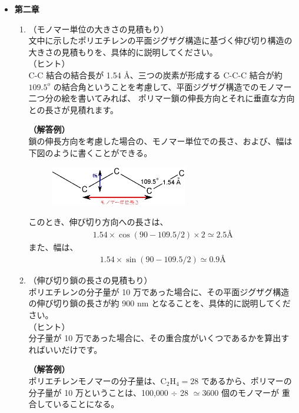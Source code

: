 \documentclass[uplatex,dvipdfmx,a4paper,11pt, titlepage]{jsarticle}
\begin{document}
\begin{itemize}
\begin{enumerate}
	\end{enumerate}

\item
{\bf 第二章}

	\begin{enumerate}
		\item
		（モノマー単位の大きさの見積もり）\\
		文中に示したポリエチレンの平面ジグザグ構造に基づく伸び切り構造の大きさの見積もりを、具体的に説明してください。\\
		（ヒント）\\
		C-C 結合の結合長が 1.54 \AA、三つの炭素が形成する C-C-C 結合が約 $109.5^o$ の結合角ということを考慮して、平面ジグザグ構造でのモノマー二つ分の絵を書いてみれば、
		ポリマー鎖の伸長方向とそれに垂直な方向との長さが見積れます。

		{\bf（解答例）}\\
		鎖の伸長方向を考慮した場合の、モノマー単位での長さ、および、幅は下図のように書くことができる。
		\begin{figure}[htb]
		\centering
		\includegraphics[width=6cm]{figure/fig1.eps}
		\end{figure}

		このとき、伸び切り方向への長さは、
		\begin{align*}
		1.54 \times \cos (90 - 109.5/2) \times 2 \simeq 2.5 \text{\AA}
		\end{align*}
		また、幅は、
		\begin{align*}
		1.54 \times \sin (90 - 109.5/2) \simeq 0.9 \text{\AA}
		\end{align*}

		\item
		（伸び切り鎖の長さの見積もり）\\
		ポリエチレンの分子量が 10 万であった場合に、その平面ジグザグ構造の伸び切り鎖の長さが約 900 nm となることを、具体的に説明してください。\\
		（ヒント）\\
		分子量が 10 万であった場合に、その重合度がいくつであるかを算出すればいいだけです。

		{\bf（解答例）}\\
		ポリエチレンモノマーの分子量は、C$_2$H$_4 = 28$ であるから、ポリマーの分子量が 10 万ということは、100,000 $\div$ 28 $\simeq $3600 個のモノマーが
		重合していることになる。


\end{enumerate}
\end{itemize}
\end{document}
